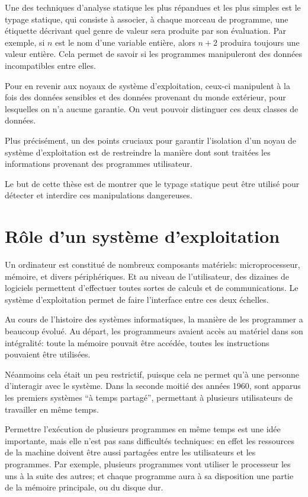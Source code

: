 Une des techniques d'analyse statique les plus répandues et les plus simples est
le typage statique, qui consiste à associer, à chaque morceau de programme, une
étiquette décrivant quel genre de valeur sera produite par son évaluation. Par
exemple, si $n$ est le nom d'une variable entière, alors $n + 2$ produira
toujours une valeur entière.
Cela permet de savoir si les programmes manipuleront des données incompatibles
entre elles.

Pour en revenir aux noyaux de système d'exploitation, ceux-ci manipulent à la
fois des données sensibles et des données provenant du monde extérieur, pour
lesquelles on n'a aucune garantie. On veut pouvoir distinguer ces deux classes
de données.

Plus précisément, un des points cruciaux pour garantir l'isolation d'un noyau de
système d'exploitation est de restreindre la manière dont sont traitées les
informations provenant des programmes utilisateur.

Le but de cette thèse est de montrer que le typage statique peut être utilisé
pour détecter et interdire ces manipulations dangereuses.

\section{Rôle d'un système d'exploitation}

Un ordinateur est constitué de nombreux composants matériels: microprocesseur,
mémoire, et divers périphériques. Et au niveau de l'utilisateur, des dizaines de
logiciels permettent d'effectuer toutes sortes de calculs et de communications.
Le système d'exploitation permet de faire l'interface entre ces deux échelles.

Au cours de l'histoire des systèmes informatiques, la manière de les programmer
a beaucoup évolué. Au départ, les programmeurs avaient accès au matériel dans
son intégralité: toute la mémoire pouvait être accédée, toutes les instructions
pouvaient être utilisées.

Néanmoins cela était un peu restrictif, puisque cela ne permet qu'à une
personne d'interagir avec le système. Dans la seconde moitié des années 1960,
sont apparus les premiers systèmes \enquote{à temps partagé}, permettant à
plusieurs utilisateurs de travailler en même temps.

Permettre l'exécution de plusieurs programmes en même temps est une idée
importante, mais elle n'est pas sans difficultés techniques: en effet les
ressources de la machine doivent être aussi partagées entre les utilisateurs et
les programmes. Par exemple, plusieurs programmes vont utiliser le processeur
les uns à la suite des autres; et chaque programme aura à sa disposition une
partie de la mémoire principale, ou du disque dur.

